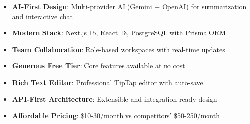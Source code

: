 \begin{itemize}[leftmargin=*,topsep=5pt,itemsep=3pt]
    \item \textbf{AI-First Design}: Multi-provider AI (Gemini + OpenAI) for summarization and interactive chat
    \item \textbf{Modern Stack}: Next.js 15, React 18, PostgreSQL with Prisma ORM
    \item \textbf{Team Collaboration}: Role-based workspaces with real-time updates
    \item \textbf{Generous Free Tier}: Core features available at no cost
    \item \textbf{Rich Text Editor}: Professional TipTap editor with auto-save
    \item \textbf{API-First Architecture}: Extensible and integration-ready design
    \item \textbf{Affordable Pricing}: \$10-30/month vs competitors' \$50-250/month
\end{itemize}
